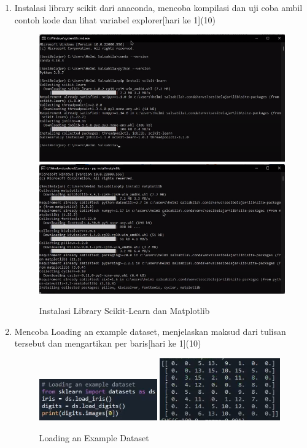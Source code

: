 \begin{enumerate}
    \item
          Instalasi library scikit dari anaconda, mencoba kompilasi dan uji coba ambil contoh kode dan lihat variabel explorer[hari ke 1](10)

          \begin{figure}[ht]
              \centerline{\includegraphics[scale=0.38]{figures/Chapter1a.png}
                  \includegraphics[scale=0.38]{figures/Chapter1b.png}}
              \caption{Instalasi Library Scikit-Learn dan Matplotlib}
              \label{Instalasi Library Scikit-Learn dan Matplotlib}
          \end{figure}

          \newpage
    \item
          Mencoba Loading an example dataset, menjelaskan maksud dari tulisan tersebut dan mengartikan per baris[hari ke 1](10)

          \begin{figure}[ht]
              \centerline{\includegraphics[scale=1]{figures/Chapter1c.png}
                  \includegraphics[scale=1]{figures/Chapter1ca.png}}
              \caption{Loading an Example Dataset}
              \label{Loading an Example Dataset}
          \end{figure}


\end{enumerate}
